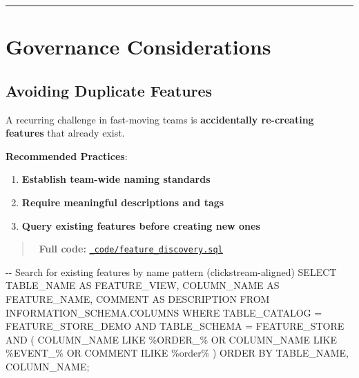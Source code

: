 \documentclass[
  letterpaper,
  DIV=11,
  numbers=noendperiod]{scrreprt}
\newenvironment{Shaded}{\begin{snugshade}}{\end{snugshade}}
\newcommand{\CommentTok}[1]{\textcolor[rgb]{0.37,0.37,0.37}{#1}}
\newcommand{\KeywordTok}[1]{\textcolor[rgb]{0.00,0.23,0.31}{#1}}
\newcommand{\NormalTok}[1]{\textcolor[rgb]{0.00,0.23,0.31}{#1}}
\newcommand{\OperatorTok}[1]{\textcolor[rgb]{0.37,0.37,0.37}{#1}}
\newcommand{\StringTok}[1]{\textcolor[rgb]{0.13,0.47,0.30}{#1}}
\providecommand{\tightlist}{%
  \setlength{\itemsep}{0pt}\setlength{\parskip}{0pt}}\usepackage{longtable,booktabs,array}
\begin{document}
\begin{center}\rule{0.5\linewidth}{0.5pt}\end{center}

\hypertarget{sec-governance}{%
\section{Governance Considerations}\label{sec-governance}}

\hypertarget{avoiding-duplicate-features}{%
\subsection{Avoiding Duplicate
Features}\label{avoiding-duplicate-features}}

A recurring challenge in fast-moving teams is \textbf{accidentally
re-creating features} that already exist.

\textbf{Recommended Practices}:

\begin{enumerate}
\def\labelenumi{\arabic{enumi}.}
\tightlist
\item
  \textbf{Establish team-wide naming standards}
\item
  \textbf{Require meaningful descriptions and tags}
\item
  \textbf{Query existing features before creating new ones}
\end{enumerate}

\begin{quote}
📁 \textbf{Full code:}
\href{_code/feature_discovery.sql}{\texttt{\_code/feature\_discovery.sql}}
\end{quote}

\begin{Shaded}
\begin{Highlighting}[]
\CommentTok{{-}{-} Search for existing features by name pattern (clickstream{-}aligned)}
\KeywordTok{SELECT} 
\NormalTok{    TABLE\_NAME }\KeywordTok{AS}\NormalTok{ FEATURE\_VIEW,}
\NormalTok{    COLUMN\_NAME }\KeywordTok{AS}\NormalTok{ FEATURE\_NAME,}
    \KeywordTok{COMMENT} \KeywordTok{AS}\NormalTok{ DESCRIPTION}
\KeywordTok{FROM}\NormalTok{ INFORMATION\_SCHEMA.}\KeywordTok{COLUMNS}
\KeywordTok{WHERE}\NormalTok{ TABLE\_CATALOG }\OperatorTok{=} \StringTok{\textquotesingle{}FEATURE\_STORE\_DEMO\textquotesingle{}}
  \KeywordTok{AND}\NormalTok{ TABLE\_SCHEMA }\OperatorTok{=} \StringTok{\textquotesingle{}FEATURE\_STORE\textquotesingle{}}
  \KeywordTok{AND}\NormalTok{ (}
\NormalTok{      COLUMN\_NAME }\KeywordTok{LIKE} \StringTok{\textquotesingle{}\%ORDER\_\%\textquotesingle{}}
      \KeywordTok{OR}\NormalTok{ COLUMN\_NAME }\KeywordTok{LIKE} \StringTok{\textquotesingle{}\%EVENT\_\%\textquotesingle{}}
      \KeywordTok{OR} \KeywordTok{COMMENT}\NormalTok{ ILIKE }\StringTok{\textquotesingle{}\%order\%\textquotesingle{}}
\NormalTok{  )}
\KeywordTok{ORDER} \KeywordTok{BY}\NormalTok{ TABLE\_NAME, COLUMN\_NAME;}
\end{Highlighting}
\end{Shaded}
\end{document}

